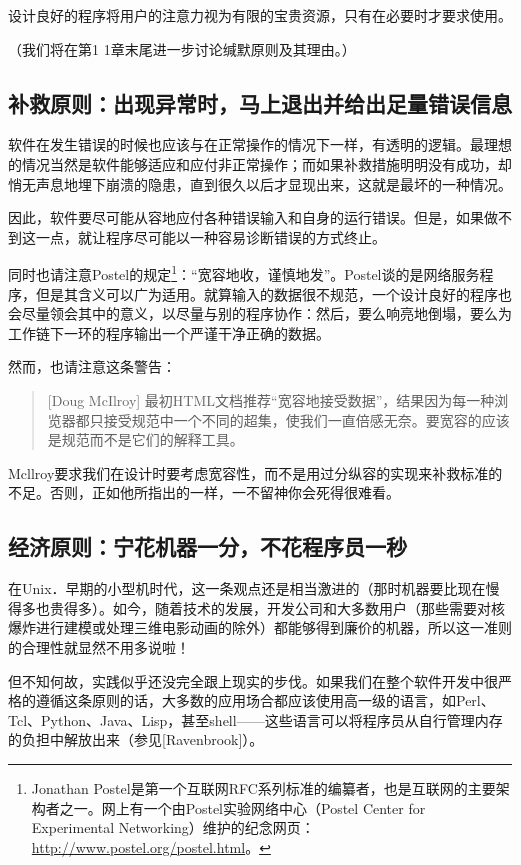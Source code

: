\documentclass[12pt,oneside]{book}
\begin{document}
\begin{common-format}
设计良好的程序将用户的注意力视为有限的宝贵资源，只有在必要时才要求使用。

（我们将在第1 1章末尾进一步讨论缄默原则及其理由。）


\subsection{补救原则：出现异常时，马上退出并给出足量错误信息}
软件在发生错误的时候也应该与在正常操作的情况下一样，有透明的逻辑。最理想的情况当然是软件能够适应和应付非正常操作；而如果补救措施明明没有成功，却悄无声息地埋下崩溃的隐患，直到很久以后才显现出来，这就是最坏的一种情况。

因此，软件要尽可能从容地应付各种错误输入和自身的运行错误。但是，如果做不到这一点，就让程序尽可能以一种容易诊断错误的方式终止。

同时也请注意Postel的规定\footnote{Jonathan Postel是第一个互联网RFC系列标准的编纂者，也是互联网的主要架构者之一。网上有一个由Postel实验网络中心（Postel Center for Experimental Networking）维护的纪念网页：\href{http://www.postel.org/postel.html}{http://www.postel.org/postel.html}。}：“宽容地收，谨慎地发”。Postel谈的是网络服务程序，但是其含义可以广为适用。就算输入的数据很不规范，一个设计良好的程序也会尽量领会其中的意义，以尽量与别的程序协作：然后，要么响亮地倒塌，要么为工作链下一环的程序输出一个严谨干净正确的数据。

然而，也请注意这条警告：

\begin{quote}[Doug McIlroy]
最初HTML文档推荐“宽容地接受数据”，结果因为每一种浏览器都只接受规范中一个不同的超集，使我们一直倍感无奈。要宽容的应该是规范而不是它们的解释工具。
\end{quote}

Mcllroy要求我们在设计时要考虑宽容性，而不是用过分纵容的实现来补救标准的不足。否则，正如他所指出的一样，一不留神你会死得很难看。

\subsection{经济原则：宁花机器一分，不花程序员一秒}
在Unix．早期的小型机时代，这一条观点还是相当激进的（那时机器要比现在慢得多也贵得多）。如今，随着技术的发展，开发公司和大多数用户（那些需要对核爆炸进行建模或处理三维电影动画的除外）都能够得到廉价的机器，所以这一准则的合理性就显然不用多说啦！

但不知何故，实践似乎还没完全跟上现实的步伐。如果我们在整个软件开发中很严格的遵循这条原则的话，大多数的应用场合都应该使用高一级的语言，如Perl、Tcl、Python、Java、Lisp，甚至shell——这些语言可以将程序员从自行管理内存的负担中解放出来（参见[Ravenbrook]）。


\end{common-format}
\end{document}
